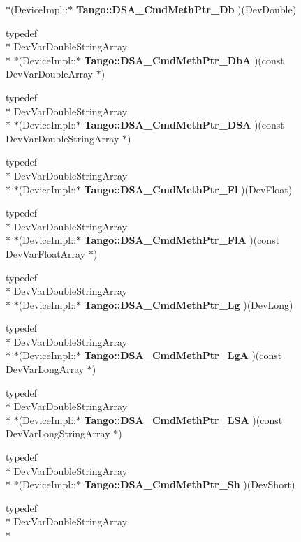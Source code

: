 \begin{DoxyCompactItemize}
$\ast$(Device\-Impl\-::$\ast$ {\bf Tango\-::\-D\-S\-A\-\_\-\-Cmd\-Meth\-Ptr\-\_\-\-Db} )(Dev\-Double)
\item 
typedef \\*
Dev\-Var\-Double\-String\-Array \\*
$\ast$(Device\-Impl\-::$\ast$ {\bf Tango\-::\-D\-S\-A\-\_\-\-Cmd\-Meth\-Ptr\-\_\-\-Db\-A} )(const Dev\-Var\-Double\-Array $\ast$)
\item 
typedef \\*
Dev\-Var\-Double\-String\-Array \\*
$\ast$(Device\-Impl\-::$\ast$ {\bf Tango\-::\-D\-S\-A\-\_\-\-Cmd\-Meth\-Ptr\-\_\-\-D\-S\-A} )(const Dev\-Var\-Double\-String\-Array $\ast$)
\item 
typedef \\*
Dev\-Var\-Double\-String\-Array \\*
$\ast$(Device\-Impl\-::$\ast$ {\bf Tango\-::\-D\-S\-A\-\_\-\-Cmd\-Meth\-Ptr\-\_\-\-Fl} )(Dev\-Float)
\item 
typedef \\*
Dev\-Var\-Double\-String\-Array \\*
$\ast$(Device\-Impl\-::$\ast$ {\bf Tango\-::\-D\-S\-A\-\_\-\-Cmd\-Meth\-Ptr\-\_\-\-Fl\-A} )(const Dev\-Var\-Float\-Array $\ast$)
\item 
typedef \\*
Dev\-Var\-Double\-String\-Array \\*
$\ast$(Device\-Impl\-::$\ast$ {\bf Tango\-::\-D\-S\-A\-\_\-\-Cmd\-Meth\-Ptr\-\_\-\-Lg} )(Dev\-Long)
\item 
typedef \\*
Dev\-Var\-Double\-String\-Array \\*
$\ast$(Device\-Impl\-::$\ast$ {\bf Tango\-::\-D\-S\-A\-\_\-\-Cmd\-Meth\-Ptr\-\_\-\-Lg\-A} )(const Dev\-Var\-Long\-Array $\ast$)
\item 
typedef \\*
Dev\-Var\-Double\-String\-Array \\*
$\ast$(Device\-Impl\-::$\ast$ {\bf Tango\-::\-D\-S\-A\-\_\-\-Cmd\-Meth\-Ptr\-\_\-\-L\-S\-A} )(const Dev\-Var\-Long\-String\-Array $\ast$)
\item 
typedef \\*
Dev\-Var\-Double\-String\-Array \\*
$\ast$(Device\-Impl\-::$\ast$ {\bf Tango\-::\-D\-S\-A\-\_\-\-Cmd\-Meth\-Ptr\-\_\-\-Sh} )(Dev\-Short)
\item 
typedef \\*
Dev\-Var\-Double\-String\-Array \\*

\end{DoxyCompactItemize}
